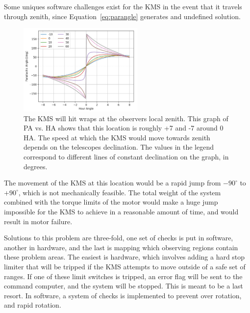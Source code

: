 \documentclass[manuscript]{aastex}
\begin{document}
Some uniques software challenges exist for the KMS in the event that it travels through zenith, since Equation~\ref{eq:parangle} generates and undefined solution.  
\begin{figure}
\vspace{-0.8cm}
  \begin{center}
    \includegraphics[width=0.55\textwidth]{km6.png}
  \end{center}
  \caption[Parallactic Angle Versus Hour Angle]{The KMS will hit wraps at the observers local zenith. This graph of PA vs. HA shows that this location is roughly +7 and -7 around 0 HA. The speed at which the KMS would move towards zenith depends on the telescopes declination. The values in the legend correspond to different lines of constant declination on the graph, in degrees.}
  \label{fig:km6}
\end{figure}
The movement of the KMS at this location would be a rapid jump from $- 90^{\circ}$ to $+ 90^{\circ}$, which is not mechanically feasible. The total weight of the system combined with the torque limits of the motor would make a huge jump impossible for the KMS to achieve in a reasonable amount of time, and would result in motor failure. 

Solutions to this problem are three-fold, one set of checks is put in software, another in hardware, and the last is mapping which observing regions contain these problem areas. The easiest is hardware, which involves adding a hard stop limiter that will be tripped if the KMS attempts to move outside of a safe set of ranges. If one of these limit switches is tripped, an error flag will be sent to the command computer, and the system will be stopped. This is meant to be a last resort. In software, a system of checks is implemented to prevent over rotation, and rapid rotation.
\end{document}

